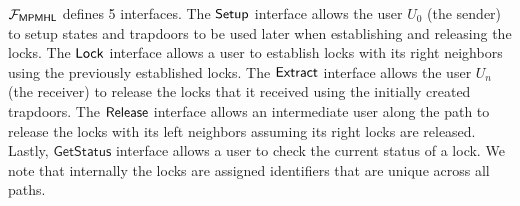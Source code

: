 $\mathcal{F}_{\mathsf{MPMHL}}$ defines 5 interfaces. The $\mathsf{Setup}$ interface allows the user $U_0$ (the sender) 
to setup states and trapdoors to be used later when establishing and releasing the locks. The $\mathsf{Lock}$ 
interface allows a user to establish locks with its right neighbors using the previously established 
locks. The $\mathsf{Extract}$ interface allows the user $U_n$ (the receiver) to release the locks that it 
received using the initially created trapdoors. The $\mathsf{Release}$ interface allows an intermediate user 
along the path to release the locks with its left neighbors assuming its right locks are released. 
Lastly, $\mathsf{GetStatus}$ interface allows a user to check the current status of a lock. We note 
that internally the locks are assigned identifiers that are unique across all paths.

\begin{figure*}[!h]
	\centering
	

\end{figure*}
